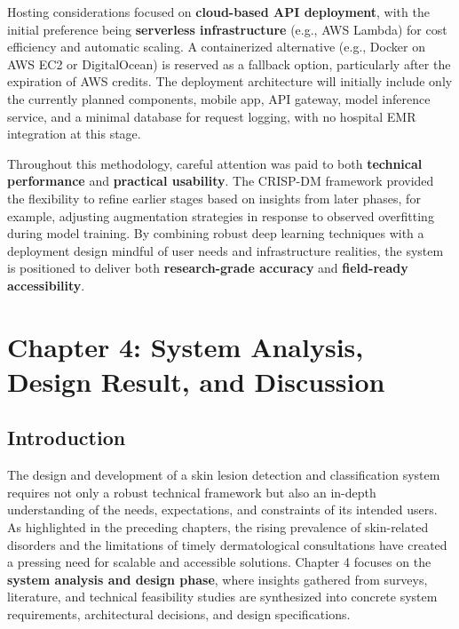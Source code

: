 \documentclass[
  12pt,
  oneside]{article}
\begin{document}
Hosting considerations focused on \textbf{cloud-based API deployment},
with the initial preference being \textbf{serverless infrastructure}
(e.g., AWS Lambda) for cost efficiency and automatic scaling. A
containerized alternative (e.g., Docker on AWS EC2 or DigitalOcean) is
reserved as a fallback option, particularly after the expiration of AWS
credits. The deployment architecture will initially include only the
currently planned components, mobile app, API gateway, model inference
service, and a minimal database for request logging, with no hospital
EMR integration at this stage.

Throughout this methodology, careful attention was paid to both
\textbf{technical performance} and \textbf{practical usability}. The
CRISP-DM framework provided the flexibility to refine earlier stages
based on insights from later phases, for example, adjusting augmentation
strategies in response to observed overfitting during model training. By
combining robust deep learning techniques with a deployment design
mindful of user needs and infrastructure realities, the system is
positioned to deliver both \textbf{research-grade accuracy} and
\textbf{field-ready accessibility}.

\newpage

\section{Chapter 4: System Analysis, Design Result, and
Discussion}\label{chapter-4-system-analysis-design-result-and-discussion}

\subsection{Introduction}\label{introduction-3}

The design and development of a skin lesion detection and classification
system requires not only a robust technical framework but also an
in-depth understanding of the needs, expectations, and constraints of
its intended users. As highlighted in the preceding chapters, the rising
prevalence of skin-related disorders and the limitations of timely
dermatological consultations have created a pressing need for scalable
and accessible solutions. Chapter 4 focuses on the \textbf{system
analysis and design phase}, where insights gathered from surveys,
literature, and technical feasibility studies are synthesized into
concrete system requirements, architectural decisions, and design
specifications.
\end{document}
